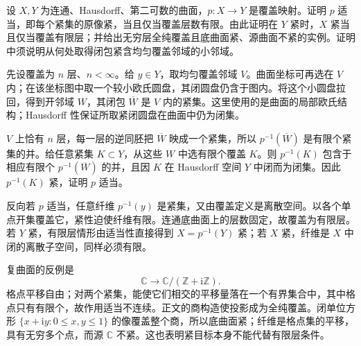 \begin{exercise}\label{b3:ex:11-4}
设 \(X,Y\) 为连通、Hausdorff、第二可数的曲面，\(p:X\to Y\) 是覆盖映射。证明 \(p\) 适当，即每个紧集的原像紧，当且仅当覆盖层数有限。由此证明在 \(Y\) 紧时，\(X\) 紧当且仅当覆盖有限层；并给出无穷层全纯覆盖且底曲面紧、源曲面不紧的实例。证明中须说明从何处取得闭包紧含均匀覆盖邻域的小邻域。
\end{exercise}
\begin{solution}
先设覆盖为 \(n\) 层、\(n<\infty\)。给 \(y\in Y\)，取均匀覆盖邻域 \(V\)。曲面坐标可再选在 \(V\) 内；在该坐标图中取一个较小欧氏圆盘，其闭圆盘仍含于图内。将这个小圆盘拉回，得到开邻域 \(W\)，其闭包 \(\overline W\) 是 \(V\) 内的紧集。这里使用的是曲面的局部欧氏结构；Hausdorff 性保证所取紧闭圆盘在曲面中仍为闭集。

\(V\) 上恰有 \(n\) 层，每一层的逆同胚把 \(\overline W\) 映成一个紧集，所以 \(p^{-1}(\overline W)\) 是有限个紧集的并。给任意紧集 \(K\subset Y\)，从这些 \(W\) 中选有限个覆盖 \(K\)。则 \(p^{-1}(K)\) 包含于相应有限个 \(p^{-1}(\overline W)\) 的并，且因 \(K\) 在 Hausdorff 空间 \(Y\) 中闭而为闭集。因此 \(p^{-1}(K)\) 紧，证明 \(p\) 适当。

反向若 \(p\) 适当，任意纤维 \(p^{-1}(y)\) 是紧集，又由覆盖定义是离散空间。以各个单点开集覆盖它，紧性迫使纤维有限。连通底曲面上的层数固定，故覆盖为有限层。若 \(Y\) 紧，有限层情形由适当性直接得到 \(X=p^{-1}(Y)\) 紧；若 \(X\) 紧，纤维是 \(X\) 中闭的离散子空间，同样必须有限。

复曲面的反例是
\[
 \mathbb C\longrightarrow\mathbb C/(\mathbb Z+\mathrm i\mathbb Z).
\]
格点平移自由；对两个紧集，能使它们相交的平移量落在一个有界集合中，其中格点只有有限个，故作用适当不连续。正文的商构造使投影成为全纯覆盖。闭单位方形 \(\{x+\mathrm i y:0\le x,y\le1\}\) 的像覆盖整个商，所以底曲面紧；纤维是格点集的平移，具有无穷多个点，而源 \(\mathbb C\) 不紧。这也表明紧目标本身不能代替有限层条件。
\end{solution}

